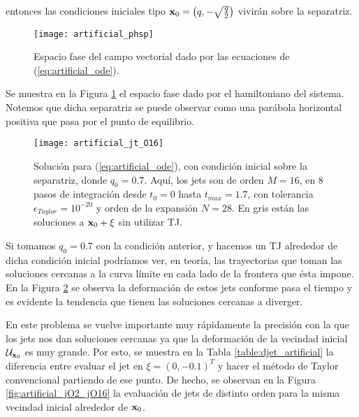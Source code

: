 entonces las condiciones iniciales tipo $\mathbf{x}_0 = \left( q, -\sqrt{\frac{q}{2}} \right)$ vivirán sobre la separatriz. 

\begin{figure}[h!]
 \centering
 \texttt{[image: artificial\_phsp]}
 \caption{Espacio fase del campo vectorial dado por las ecuaciones de (\ref{eq:artificial_ode}).}
 \label{fig:artificial_phsp}
\end{figure}

Se muestra en la Figura \ref{fig:artificial_phsp} el espacio fase dado por el hamiltoniano del sistema. Notemos que dicha separatriz se puede observar como una parábola horizontal positiva que pasa por el punto de equilibrio.

\begin{figure}[h!]
 \centering
 \texttt{[image: artificial\_jt\_O16]}
 \caption{Solución para (\ref{eq:artificial_ode}), con condición inicial sobre la separatriz, donde $q_0 = 0.7$. Aquí, los jets son de orden $M=16$, en $8$ pasos de integración desde $t_0 = 0$ hasta $t_{max} = 1.7$, con tolerancia $\epsilon_{Taylor} = 10^{-20}$ y orden de la expansión $N=28$. En gris están las soluciones a $\mathbf{x}_0 + \xi$ sin utilizar TJ.}
 \label{fig:artificial_jt}
\end{figure}

Si tomamos $q_0 = 0.7$ con la condición anterior, y hacemos un TJ alrededor de dicha condición inicial podríamos ver, en teoría, las trayectorias que toman las soluciones cercanas a la curva límite en cada lado de la frontera que ésta impone. En la Figura \ref{fig:artificial_jt} se observa la deformación de estos jets conforme pasa el tiempo y es evidente la tendencia que tienen las soluciones cercanas a diverger.

En este problema se vuelve importante muy rápidamente la precisión con la que los jets nos dan soluciones cercanas ya que la deformación de la vecindad inicial $\mathcal{U}_{\mathbf{x}_0}$ es muy grande. Por esto, se muestra en la Tabla \ref{table:djet_artificial} la diferencia entre evaluar el jet en $\xi = (0,-0.1)^T$ y hacer el método de Taylor convencional partiendo de ese punto. De hecho, se observan en la Figura \ref{fig:artificial_jO2_jO16} la evaluación de jets de distinto orden para la misma vecindad inicial alrededor de $\mathbf{x}_0$.

